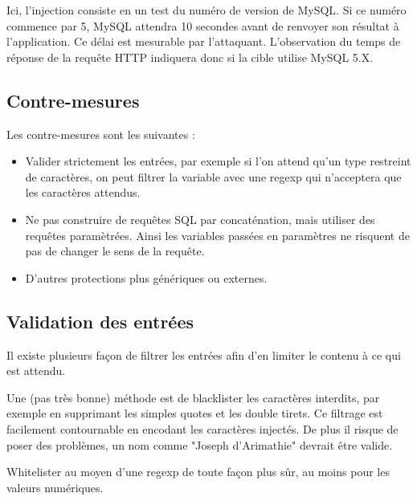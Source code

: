 Ici, l'injection consiste en un test du numéro de version de MySQL. Si ce numéro commence par 5, MySQL attendra 10 secondes avant de renvoyer son résultat à l'application. Ce délai est mesurable par l'attaquant. L'observation du temps de réponse de la requête HTTP indiquera donc si la cible utilise MySQL 5.X.

\subsection{Contre-mesures}\label{vulnerabilites:web:sqli:countermeasures}

Les contre-mesures sont les suivantes :
\begin{tabbing}
\end{tabbing}
\begin{itemize}
\item Valider strictement les entrées, par exemple si l'on attend qu'un type restreint de caractères, on peut filtrer la variable avec une regexp qui n'acceptera que les caractères attendus.
\item Ne pas construire de requêtes SQL par concaténation, mais utiliser des requêtes paramètrées. Ainsi les variables passées en paramètres ne risquent de pas de changer le sens de la requête.
\item D'autres protections plus génériques ou externes.
\end{itemize}

\subsection{Validation des entrées}\label{vulnerabilites:web:sqli:countermeasures:validation}

Il existe plusieurs façon de filtrer les entrées afin d'en limiter le contenu à ce qui est attendu.

\begin{tabbing}
\end{tabbing}
Une (pas très bonne) méthode est de blacklister les caractères interdits, par exemple en supprimant les simples quotes et les double tirets. Ce filtrage est facilement contournable en encodant les caractères injectés. De plus il risque de poser des problèmes, un nom comme "Joseph d'Arimathie" devrait être valide.

\begin{tabbing}
\end{tabbing}
Whitelister au moyen d'une regexp de toute façon plus sûr, au moins pour les valeurs numériques.

